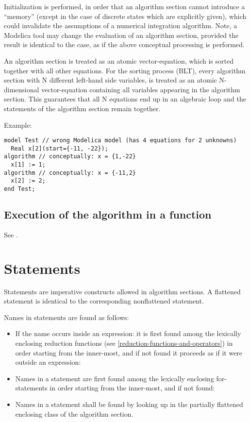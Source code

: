 \begin{nonnormative}
Initialization is performed, in order that an algorithm section
cannot introduce a ``memory'' (except in the case of discrete states which
are explicitly given), which could invalidate the assumptions of a
numerical integration algorithm. Note, a Modelica tool may change the
evaluation of an algorithm section, provided the result is identical to
the case, as if the above conceptual processing is performed.

An algorithm section is treated as an atomic vector-equation,
which is sorted together with all other equations. For the sorting
process (BLT), every algorithm section with N different left-hand side
variables, is treated as an atomic N-dimensional vector-equation
containing all variables appearing in the algorithm section. This
guarantees that all N equations end up in an algebraic loop and the
statements of the algorithm section remain together.

Example:
\begin{lstlisting}[language=modelica]
model Test // wrong Modelica model (has 4 equations for 2 unknowns)
  Real x[2](start={-11, -22});
algorithm // conceptually: x = {1,-22}
  x[1] := 1;
algorithm // conceptually: x = {-11,2}
  x[2] := 2;
end Test;
\end{lstlisting}
\end{nonnormative}

\subsection{Execution of the algorithm in a function}\label{execution-of-the-algorithm-in-a-function}

See .

\section{Statements}\label{statements}

Statements are imperative constructs allowed in algorithm sections. A
flattened statement is identical to the corresponding nonflattened
statement.

Names in statements are found as follows:
\begin{itemize}
\item
  If the name occurs inside an expression: it is first found among the
  lexically enclosing reduction functions (see \cref{reduction-functions-and-operators}) in order
  starting from the inner-most, and if not found it proceeds as if it
  were outside an expression:
\item
  Names in a statement are first found among the lexically enclosing
  for-statements in order starting from the inner-most, and if not
  found:
\item
  Names in a statement shall be found by looking up in the partially
  flattened enclosing class of the algorithm section.
\end{itemize}

